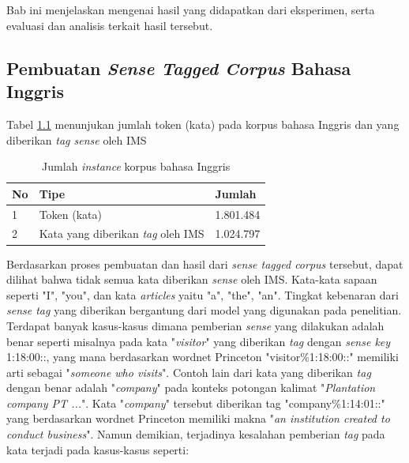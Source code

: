 \chapter{\babLima}
Bab ini menjelaskan mengenai hasil yang didapatkan dari eksperimen, serta evaluasi dan analisis terkait hasil tersebut.

\section{Pembuatan \textit{Sense Tagged Corpus} Bahasa Inggris}
Tabel \ref{table:sense-tagged-corpus} menunjukan jumlah token (kata) pada korpus bahasa Inggris dan yang diberikan \textit{tag sense} oleh IMS

\begin{table}
	\centering
	\caption{Jumlah \textit{instance} korpus bahasa Inggris}
	\label{table:sense-tagged-corpus}
	\begin{tabular}{|p{0.7cm}|p{4cm}|p{4cm}|}
		\hline
		No & Tipe & Jumlah
		\\ \hline
		1    & 
		Token (kata)   & 
		1.801.484
		\\ \hline
		2    & 
		Kata yang diberikan \textit{tag} oleh IMS     & 
		1.024.797 
		\\ \hline
	\end{tabular}
\end{table}

Berdasarkan proses pembuatan dan hasil dari \textit{sense tagged corpus} tersebut, dapat dilihat bahwa tidak semua kata diberikan \textit{sense} oleh IMS. Kata-kata sapaan seperti "I", "you", dan kata \textit{articles} yaitu "a", "the", "an". Tingkat kebenaran dari \textit{sense tag} yang diberikan bergantung dari model yang digunakan pada penelitian. Terdapat banyak kasus-kasus dimana pemberian \textit{sense} yang dilakukan adalah benar seperti misalnya pada kata "\textit{visitor}" yang diberikan \textit{tag} dengan \textit{sense key} 1:18:00::, yang mana berdasarkan wordnet Princeton "visitor\%1:18:00::" memiliki arti sebagai "\textit{someone who visits}". Contoh lain dari kata yang diberikan \textit{tag} dengan benar adalah "\textit{company}" pada konteks potongan kalimat "\textit{Plantation company PT ...}". Kata "\textit{company}" tersebut diberikan tag "company\%1:14:01::" yang berdasarkan wordnet Princeton memiliki makna "\textit{an institution created to conduct business}". Namun demikian, terjadinya kesalahan pemberian \textit{tag} pada kata terjadi pada kasus-kasus seperti: 

